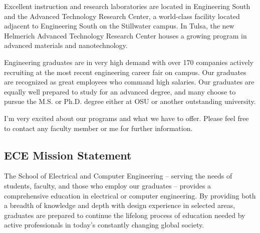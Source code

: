 Excellent instruction and research laboratories are located in Engineering South and the Advanced Technology Research Center, a world-class facility located adjacent to Engineering South on the Stillwater campus. In Tulsa, the new Helmerich Advanced Technology Research Center houses a growing program in advanced materials and nanotechnology. 

Engineering graduates are in very high demand with over 170 companies actively recruiting at the most recent engineering career fair on campus. Our graduates are recognized as great employees who command high salaries. Our graduates are equally well prepared to study for an advanced degree, and many choose to pursue the M.S. or Ph.D. degree either at OSU or another outstanding university.

I’m very excited about our programs and what we have to offer. Please feel free to contact any faculty member or me for further information.

\subsection{ECE Mission Statement}

The School of Electrical and Computer Engineering – serving the needs of students, faculty, and those who employ our graduates – provides a comprehensive education in electrical or computer engineering. By providing both a breadth of knowledge and depth with design experience in selected areas, graduates are prepared to continue the lifelong process of education needed by active professionals in today's constantly changing global society.


